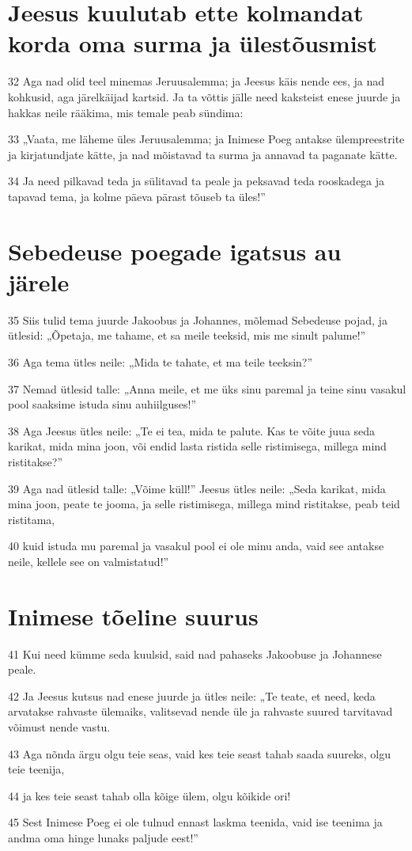 \section*{Jeesus kuulutab ette kolmandat korda oma surma ja ülestõusmist}

\par 32 Aga nad olid teel minemas Jeruusalemma; ja Jeesus käis nende ees, ja nad kohkusid, aga järelkäijad kartsid. Ja ta võttis jälle need kaksteist enese juurde ja hakkas neile rääkima, mis temale peab sündima:
\par 33 „Vaata, me läheme üles Jeruusalemma; ja Inimese Poeg antakse ülempreestrite ja kirjatundjate kätte, ja nad mõistavad ta surma ja annavad ta paganate kätte.
\par 34 Ja need pilkavad teda ja sülitavad ta peale ja peksavad teda rooskadega ja tapavad tema, ja kolme päeva pärast tõuseb ta üles!”

\section*{Sebedeuse poegade igatsus au järele}

\par 35 Siis tulid tema juurde Jakoobus ja Johannes, mõlemad Sebedeuse pojad, ja ütlesid: „Õpetaja, me tahame, et sa meile teeksid, mis me sinult palume!”
\par 36 Aga tema ütles neile: „Mida te tahate, et ma teile teeksin?”
\par 37 Nemad ütlesid talle: „Anna meile, et me üks sinu paremal ja teine sinu vasakul pool saaksime istuda sinu auhiilguses!”
\par 38 Aga Jeesus ütles neile: „Te ei tea, mida te palute. Kas te võite juua seda karikat, mida mina joon, või endid lasta ristida selle ristimisega, millega mind ristitakse?”
\par 39 Aga nad ütlesid talle: „Võime küll!” Jeesus ütles neile: „Seda karikat, mida mina joon, peate te jooma, ja selle ristimisega, millega mind ristitakse, peab teid ristitama,
\par 40 kuid istuda mu paremal ja vasakul pool ei ole minu anda, vaid see antakse neile, kellele see on valmistatud!”

\section*{Inimese tõeline suurus}

\par 41 Kui need kümme seda kuulsid, said nad pahaseks Jakoobuse ja Johannese peale.
\par 42 Ja Jeesus kutsus nad enese juurde ja ütles neile: „Te teate, et need, keda arvatakse rahvaste ülemaiks, valitsevad nende üle ja rahvaste suured tarvitavad võimust nende vastu.
\par 43 Aga nõnda ärgu olgu teie seas, vaid kes teie seast tahab saada suureks, olgu teie teenija,
\par 44 ja kes teie seast tahab olla kõige ülem, olgu kõikide ori!
\par 45 Sest Inimese Poeg ei ole tulnud ennast laskma teenida, vaid ise teenima ja andma oma hinge lunaks paljude eest!”

